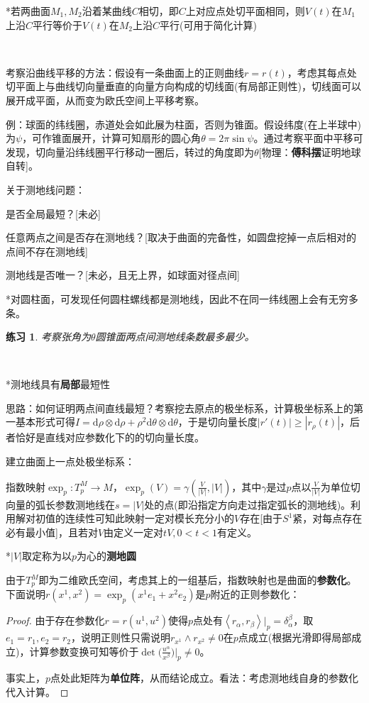 \documentclass[a4paper,UTF8,fontset=windows]{ctexart}
\newtheorem*{hw}{练习}
\begin{document}
*若两曲面$M_1,M_2$沿着某曲线$C$相切，即$C$上对应点处切平面相同，则$V(t)$在$M_1$上沿$C$平行等价于$V(t)$在$M_2$上沿$C$平行(可用于简化计算)

\

考察沿曲线平移的方法：假设有一条曲面上的正则曲线$r=r(t)$，考虑其每点处切平面上与曲线切向量垂直的向量方向构成的切线面(有局部正则性)，切线面可以展开成平面，从而变为欧氏空间上平移考察。

例：球面的纬线圈，赤道处会如此展为柱面，否则为锥面。假设纬度(在上半球中)为$\psi$，可作锥面展开，计算可知扇形的圆心角$\theta=2\pi\sin\psi$。通过考察平面中平移可发现，切向量沿纬线圈平行移动一圈后，转过的角度即为$\theta$[物理：\textbf{傅科摆}证明地球自转]。

关于测地线问题：

是否全局最短？[未必]

任意两点之间是否存在测地线？[取决于曲面的完备性，如圆盘挖掉一点后相对的点间不存在测地线]

测地线是否唯一？[未必，且无上界，如球面对径点间]

*对圆柱面，可发现任何圆柱螺线都是测地线，因此不在同一纬线圈上会有无穷多条。

\begin{hw}
考察张角为$\theta$圆锥面两点间测地线条数最多最少。
\end{hw}

\

*测地线具有\textbf{局部}最短性

思路：如何证明两点间直线最短？考察挖去原点的极坐标系，计算极坐标系上的第一基本形式可得$I=\mathrm{d}\rho\otimes\mathrm{d}\rho+\rho^2\mathrm{d}\theta\otimes\mathrm{d}\theta$，于是切向量长度$|r'(t)|\ge|r_\rho(t)|$，后者恰好是直线对应参数化下的的切向量长度。

建立曲面上一点处极坐标系：

指数映射$\exp_p:T_p^M\to M$，$\exp_p(V)=\gamma(\frac{V}{|V|},|V|)$，其中$\gamma$是过$p$点以$\frac{V}{|V|}$为单位切向量的弧长参数测地线在$s=|V|$处的点(即沿指定方向走过指定弧长的测地线)。利用解对初值的连续性可知此映射一定对模长充分小的$V$存在[由于$S^1$紧，对每点存在必有最小值]，且若对$V$由定义一定对$tV,0<t<1$有定义。

*$|V|$取定称为以$p$为心的\textbf{测地圆}

由于$T_p^M$即为二维欧氏空间，考虑其上的一组基后，指数映射也是曲面的\textbf{参数化}。下面说明$r(x^1,x^2)=\exp_p(x^1e_1+x^2e_2)$是$p$附近的正则参数化：

\begin{proof}
由于存在参数化$r=r(u^1,u^2)$使得$p$点处有$\left<r_\alpha,r_\beta\right>\big|_p=\delta_\alpha^\beta$，取$e_1=r_1,e_2=r_2$，说明正则性只需说明$r_{x^1}\wedge r_{x^2}\ne0$在$p$点成立(根据光滑即得局部成立)，计算参数变换可知等价于$\det\big(\frac{u^\alpha}{x^\beta}\big)\big|_p\ne0$。

事实上，$p$点处此矩阵为\textbf{单位阵}，从而结论成立。看法：考虑测地线自身的参数化代入计算。
\end{proof}
\end{document}
